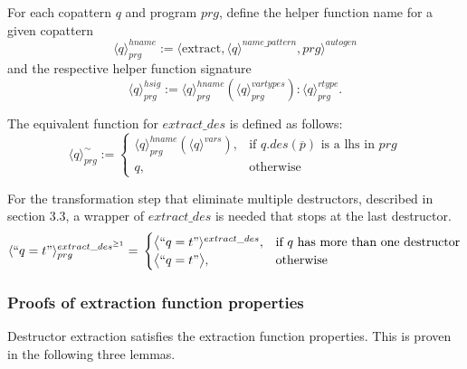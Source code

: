 For each copattern $q$ and program $prg$, define the helper function name for a given copattern
\begin{equation*}
\langle q \rangle^{hname}_{prg} := \langle \textrm{extract}, \langle q \rangle^{name\_pattern}, prg \rangle^{autogen}
\end{equation*}
and the respective helper function signature
\begin{equation*}
\langle q \rangle^{hsig}_{prg} := \langle q \rangle^{hname}_{prg}(\langle q \rangle^{vartypes}_{prg}): \langle q \rangle^{rtype}_{prg}.
\end{equation*}

The equivalent function for $extract\_des$ is defined as follows:
\[
    \langle q \rangle^{\sim}_{prg} :=
\begin{cases}
    \langle q \rangle^{hname}_{prg}(\langle q \rangle^{vars}),& \text{if $q.des(\overline{p})$ is a lhs in $prg$} \\
    q,                                                                                      & \text{otherwise}
\end{cases}
\]

For the transformation step that eliminate multiple destructors, described in section 3.3, a wrapper of $extract\_des$ is needed that stops at the last destructor.
\[
    \langle `` q = t " \rangle^{extract\_des^{\geq 1}}_{prg} =\\
\begin{cases}
    \big\langle `` q = t " \rangle^{extract\_des},& \text{if $q$ has more than one destructor} \\
   \big\langle `` q = t " \big\rangle,& \text{otherwise}
\end{cases}
\]

\subsubsection{Proofs of extraction function properties}

Destructor extraction satisfies the extraction function properties. This is proven in the following three lemmas.

